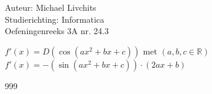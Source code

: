 \documentclass[a4paper]{article}
\begin{document}
  
\noindent \large Auteur: Michael Livchits \\
\noindent \large Studierichting: Informatica\\
\noindent \large Oefeningenreeks 3A nr. 24.3\\

\medskip

\normalsize

$f'(x) = D\left(\cos(ax^2+bx+c)\right)$ met $(a,b,c \in \mathbb{R})$\\

$f'(x) = -(\sin(ax^2+bx+c))\cdot (2ax+b)$\\


\begin{thebibliography}{999}
\end{thebibliography}
\end{document}

